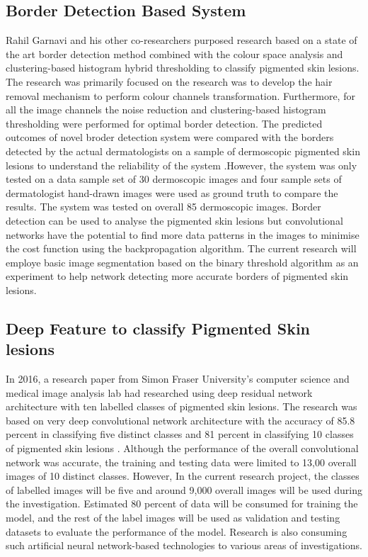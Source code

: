 \subsection{Border Detection Based System}
Rahil Garnavi and his other co-researchers purposed research based on a state of the art border detection method combined with the colour space analysis and clustering-based histogram hybrid thresholding to classify pigmented skin lesions.
 The research was primarily focused on the research was to develop the hair removal mechanism to perform colour channels transformation. Furthermore, for all the image channels the noise reduction 
and clustering-based histogram thresholding were performed for optimal border detection. The predicted outcomes of novel broder detection system were compared with the 
borders detected by the actual dermatologists on a sample of 
dermoscopic pigmented skin lesions to understand the reliability of the 
system \citep*{GARNAVI2011105}.However, the system was only tested on a data sample set of 
30 dermoscopic images and four sample sets of dermatologist hand-drawn images were used as ground truth to compare the results. The system was tested on overall 85 dermoscopic images.
Border detection can be used to analyse the pigmented skin lesions but convolutional networks have the potential to find more data patterns in the images to minimise the cost function 
using the backpropagation algorithm. The current research will 
employe basic image segmentation based on the binary threshold 
algorithm as an experiment to help network detecting more accurate
borders of pigmented skin lesions.

\subsection*{Deep Feature to classify Pigmented Skin lesions}

In 2016, a research paper from Simon Fraser University’s computer science and medical image analysis lab had researched using 
deep residual network architecture with ten labelled 
classes of pigmented skin lesions. The research was based on very 
deep convolutional network architecture with the accuracy 
of 85.8 percent in classifying five distinct classes and
81 percent in classifying 10 classes of pigmented skin lesions
\citep*{7493528}. Although the performance of the overall convolutional network was accurate, the training and testing data were limited to 13,00 overall images of 10 distinct classes.
 However, In the current research project, the classes of labelled images will be five and around 9,000 overall images will be used during the investigation.
 Estimated 80 percent of data will be consumed for training the model, and the rest of the label images will be used as validation and testing datasets 
 to evaluate the performance of the model. 
 Research is also consuming such artificial neural network-based technologies to various areas of investigations.